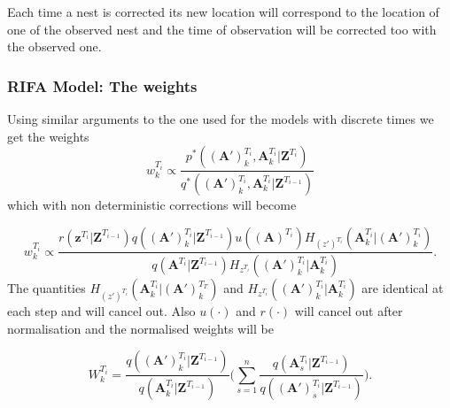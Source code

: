 \documentclass[9pt, xcolor={dvipsnames,svgnames,table}]{beamer}
\begin{document}
\begin{frame}
    Each time a nest is corrected its new location will correspond to the location of one of the observed nest and the time of observation will be corrected too with the observed one.
\end{frame}

\begin{frame}
\frametitle{RIFA Model: The weights}
    Using similar arguments to the one used for the models with discrete times we get the weights
    \begin{equation*}
        w^{T_i}_k \propto \frac{p^*(\bm{(A')}^{T_i}_k, \bm{A}^{T_i}_k | \bm{Z}^{T_i})} {q^*(\bm{(A')}^{T_i}_k, \bm{A}^{T_i}_k | \bm{Z}^{T_{i-1}})}
    \end{equation*}
    which with non deterministic corrections will become

    \begin{equation*}
        w^{T_i}_k \propto \frac{r(\bm{z}^{T_i}| \bm{Z}^{T_{i-1}}) q(\bm{(A')}^{T_i}_k | \bm{Z}^{T_{i-1}}) u(\bm{(A)}^{T_i}) H_{(z')^{T_i}} (\bm{A}^{T_i}_k | \bm{(A')}^{T_i}_k)}{q(\bm{A}^{T_i} | \bm{Z}^{T_{i-1}}) H_{z^{T_i}} (\bm{(A')}^{T_i}_k | \bm{A}^{T_i}_k)}.
    \end{equation*}
    The quantities $H_{(z')^{T_i}} (\bm{A}^{T_i}_k | \bm{(A')}^{T_T}_k)$ and $H_{z^{T_i}} (\bm{(A')}^{T_i}_k | \bm{A}^{T_i}_k)$ are identical at each step and will cancel out. Also $u(\cdot)$ and $r(\cdot)$ will cancel out after normalisation and the normalised weights will be

    \begin{equation*}
        W^{T_i}_k = \frac{q(\bm{(A')}^{T_i}_k | \bm{Z}^{T_{i-1}})}{q(\bm{A}^{T_i}_k | \bm{Z}^{T_{i-1}})} \Bigg( \sum_{s=1}^n \frac{q(\bm{A}^{T_i}_s | \bm{Z}^{T_{i-1}})}{q(\bm{(A')}^{T_i}_s | \bm{Z}^{T_{i-1}})} \Bigg).
    \end{equation*}
\end{frame}
\end{document}
